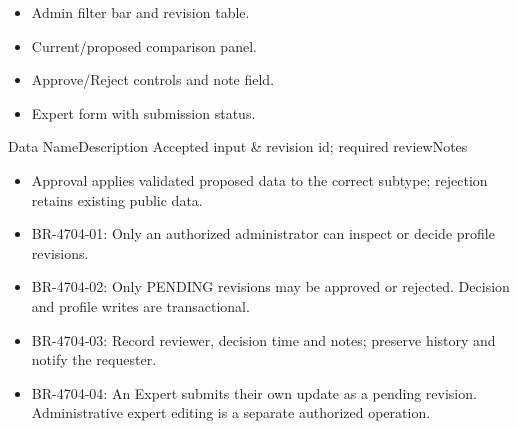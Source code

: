 \begin{itemize}[leftmargin=1.6em,topsep=3pt,itemsep=2pt,parsep=0pt,label=$\bullet$]
    \item Admin filter bar and revision table.
    \item Current/proposed comparison panel.
    \item Approve/Reject controls and note field.
    \item Expert form with submission status.
\end{itemize}


\begin{specdatatable}{Data Name}{Description}
Accepted input & revision id; required reviewNotes\\ \hline
\end{specdatatable}

\begin{itemize}[leftmargin=1.6em,topsep=3pt,itemsep=2pt,parsep=0pt,label=$\bullet$]
    \item Approval applies validated proposed data to the correct subtype; rejection retains existing public data.
\end{itemize}

\begin{itemize}[leftmargin=1.6em,topsep=3pt,itemsep=2pt,parsep=0pt,label=$\bullet$]\brrulelist
    \item BR-4704-01: Only an authorized administrator can inspect or decide profile revisions.
    \item BR-4704-02: Only PENDING revisions may be approved or rejected. Decision and profile writes are transactional.
    \item BR-4704-03: Record reviewer, decision time and notes; preserve history and notify the requester.
    \item BR-4704-04: An Expert submits their own update as a pending revision. Administrative expert editing is a separate authorized operation.
\end{itemize}


